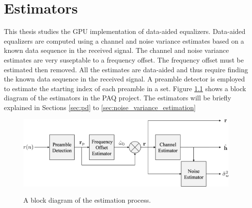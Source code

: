 

\chapter{Estimators}
\label{sec:estimators}
This thesis studies the GPU implementation of data-aided equalizers.
Data-aided equalizers are computed using a channel and noise variance estimates based on a known data sequence in the received signal.
The channel and noise variance estimates are very suseptable to a frequency offset.
The frequency offset must be estimated then removed.
All the estimates are data-aided and thus require finding the known data sequence in the received signal.
A preamble detector is employed to estimate the starting index of each preamble in a set.
Figure \ref{fig:estimatorBlock} shows a block diagram of the estimators in the PAQ project.
The estimators will be briefly explained in Sections \ref{sec:pd} to \ref{sec:noise_variance_estimation}
\begin{figure}
	\centering\includegraphics[width=10.33in/100*55]{figures/systemOverview/estimatorBlock.pdf}
	\label{fig:estimatorBlock}
	\caption{A block diagram of the estimation process.}
\end{figure}

